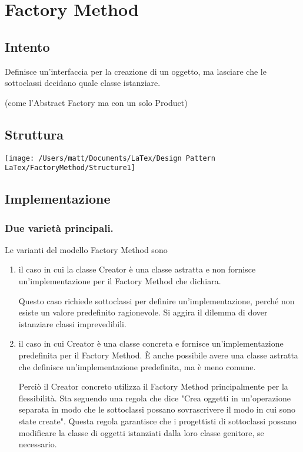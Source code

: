 \chapter{Factory Method}
\section{Intento}

Definisce un'interfaccia per la creazione di un oggetto, ma lasciare che le sottoclassi decidano quale classe istanziare.

(come l'Abstract Factory ma con un solo Product)


\section{Struttura}

\texttt{[image: /Users/matt/Documents/LaTex/Design Pattern LaTex/FactoryMethod/Structure1]}


\section{Implementazione}

\subsection{Due varietà principali.}
Le varianti del modello Factory Method sono

\begin{enumerate}
    \item il caso in cui la classe Creator è una classe astratta e non fornisce un'implementazione per il Factory Method che dichiara.

    Questo caso richiede sottoclassi per definire un'implementazione, perché non esiste un valore predefinito ragionevole. Si aggira il dilemma di dover istanziare classi imprevedibili.

    \item il caso in cui Creator è una classe concreta e fornisce un'implementazione predefinita per il Factory Method. È anche possibile avere una classe astratta che definisce un'implementazione predefinita, ma è meno comune.

    Perciò il Creator concreto utilizza il Factory Method principalmente per la flessibilità. Sta seguendo una regola che dice "Crea oggetti in un'operazione separata in modo che le sottoclassi possano sovrascrivere il modo in cui sono state create". Questa regola garantisce che i progettisti di sottoclassi possano modificare la classe di oggetti istanziati dalla loro classe genitore, se necessario.

\end{enumerate}

